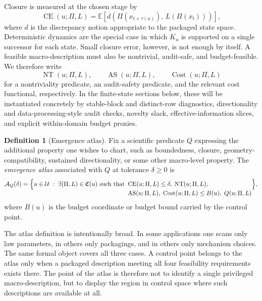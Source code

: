 \documentclass[11pt]{article}
\theoremstyle{definition}
\newtheorem{definition}{Definition}[section]
\begin{document}
Closure is measured at the chosen stage by
\[
\operatorname{CE}(u;\Pi,L)
=
\mathbb{E}\!\left[d\!\left(\Pi(x_{t+\tau(u)}),\,L(\Pi(x_t))\right)\right],
\]
where $d$ is the discrepancy notion appropriate to the packaged state space. Deterministic dynamics are the special case in which $K_u$ is supported on a single successor for each state. Small closure error, however, is not enough by itself. A feasible macro-description must also be nontrivial, audit-safe, and budget-feasible. We therefore write
\[
\operatorname{NT}(u;\Pi,L), \qquad \operatorname{AS}(u;\Pi,L), \qquad \operatorname{Cost}(u;\Pi,L)
\]
for a nontriviality predicate, an audit-safety predicate, and the relevant cost functional, respectively. In the finite-state sections below, these will be instantiated concretely by stable-block and distinct-row diagnostics, directionality and data-processing-style audit checks, novelty slack, effective-information slices, and explicit within-domain budget proxies.

\begin{definition}[Emergence atlas]\label{def:emergence_atlas}
Fix a scientific predicate $Q$ expressing the additional property one wishes to chart, such as boundedness, closure, geometry-compatibility, sustained directionality, or some other macro-level property. The \emph{emergence atlas} associated with $Q$ at tolerance $\delta \ge 0$ is
\[
\mathcal{A}_{Q}(\delta)
=
\Bigl\{
\begin{aligned}[t]
u \in \mathcal{U}
\;:\;
\exists (\Pi,L) \in \mathfrak{C}(u)
\text{ such that }&
\operatorname{CE}(u;\Pi,L) \le \delta,\;
\operatorname{NT}(u;\Pi,L),\\
&
\operatorname{AS}(u;\Pi,L),\;
\operatorname{Cost}(u;\Pi,L) \le B(u),\;
Q(u;\Pi,L)
\end{aligned}
\Bigr\},
\]
where $B(u)$ is the budget coordinate or budget bound carried by the control point.
\end{definition}

The atlas definition is intentionally broad. In some applications one scans only law parameters, in others only packagings, and in others only mechanism choices. The same formal object covers all three cases. A control point belongs to the atlas only when a packaged description meeting all four feasibility requirements exists there. The point of the atlas is therefore not to identify a single privileged macro-description, but to display the region in control space where such descriptions are available at all.
\end{document}
